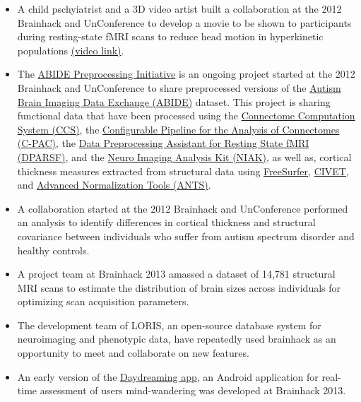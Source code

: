 \documentclass[11pt]{bmc_article_s50}
\begin{document}
\begin{itemize}
\item 
  A child pschyiatrist and a 3D video artist built a collaboration at the 2012 Brainhack and UnConference to develop a movie to be shown to participants during resting-state fMRI scans to reduce head motion in hyperkinetic populations \href{http://vimeo.com/67962604}{(video link)}\cite{vanderwal2015}.
\item 
  The \href{http://preprocessed-connectomes-project.github.io/abide}{ABIDE Preprocessing Initiative} is an ongoing project started at the 2012 Brainhack and UnConference to share preprocessed versions of the \href{http://fcon_1000.projects.nitrc.org/indi/abide}{Autism Brain Imaging Data Exchange (ABIDE)} dataset. This project is sharing functional data that have been processed using the \href{http://lfcd.psych.ac.cn/ccs.html}{Connectome Computation System (CCS)}, the \href{http://fcp-indi.github.io}{Configurable Pipeline for the Analysis of Connectomes (C-PAC)}, the \href{http://rfmri.org/DPARSF}{Data Preprocessing Assistant for Resting State fMRI (DPARSF)}, and the \href{https://www.nitrc.org/projects/niak/}{Neuro Imaging Analysis Kit (NIAK)}, as well as, cortical thickness measures extracted from structural data using \href{http://freesurfer.net/}{FreeSurfer}, \href{http://www.bic.mni.mcgill.ca/ServicesSoftware/CIVET}{CIVET}, and \href{http://picsl.upenn.edu/software/ants/}{Advanced Normalization Tools (ANTS)}.
\item
  A collaboration started at the 2012 Brainhack and UnConference performed an analysis to identify differences in cortical thickness and structural covariance between individuals who suffer from autism spectrum disorder and healthy controls\cite{Valk2015}.
\item 
  A project team at Brainhack 2013 amassed a dataset of 14,781 structural MRI scans to estimate the distribution of brain sizes across individuals for optimizing scan acquisition parameters\cite{Mennes2014}.
\item 
  The development team of LORIS, an open-source database system for neuroimaging and phenotypic data, have repeatedly used brainhack as an opportunity to meet and collaborate on new features\cite{Das2012}.
\item
  An early version of the \href{http://daydreaming-the-app.net}{Daydreaming app}, an Android application for real-time assessment of users mind-wandering was developed at Brainhack 2013.
\end{itemize}
\end{document}
